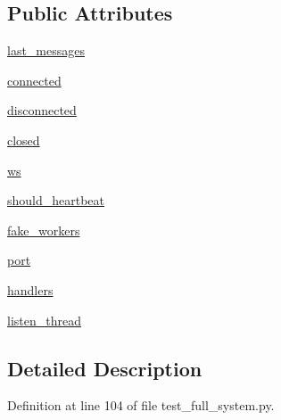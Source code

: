 \subsection*{Public Attributes}
\begin{DoxyCompactItemize}
\item 
\hyperlink{classparlai_1_1mturk_1_1core_1_1legacy__2018_1_1test_1_1test__full__system_1_1MockSocket_a24e7588b1330ebe50423cdfed7f11374}{last\+\_\+messages}
\item 
\hyperlink{classparlai_1_1mturk_1_1core_1_1legacy__2018_1_1test_1_1test__full__system_1_1MockSocket_a5e2362f162ac68cbc8ef7e6c8c356c23}{connected}
\item 
\hyperlink{classparlai_1_1mturk_1_1core_1_1legacy__2018_1_1test_1_1test__full__system_1_1MockSocket_a71c8013d07129adaf161734fcd0f7d63}{disconnected}
\item 
\hyperlink{classparlai_1_1mturk_1_1core_1_1legacy__2018_1_1test_1_1test__full__system_1_1MockSocket_a1f98802a97d72a1fcddcbbcdab42e6dc}{closed}
\item 
\hyperlink{classparlai_1_1mturk_1_1core_1_1legacy__2018_1_1test_1_1test__full__system_1_1MockSocket_a4880b2d86e4a803c00b8a3b1b9b83eeb}{ws}
\item 
\hyperlink{classparlai_1_1mturk_1_1core_1_1legacy__2018_1_1test_1_1test__full__system_1_1MockSocket_a390a8d5ddb5ab5e78079a83bf16c88d7}{should\+\_\+heartbeat}
\item 
\hyperlink{classparlai_1_1mturk_1_1core_1_1legacy__2018_1_1test_1_1test__full__system_1_1MockSocket_a9f9ba0003113026f7bd4e0cc4d6c3b24}{fake\+\_\+workers}
\item 
\hyperlink{classparlai_1_1mturk_1_1core_1_1legacy__2018_1_1test_1_1test__full__system_1_1MockSocket_a89cd4136510a4128b6307982f97103b1}{port}
\item 
\hyperlink{classparlai_1_1mturk_1_1core_1_1legacy__2018_1_1test_1_1test__full__system_1_1MockSocket_a531df078fba32032d5bbc2aa913b5ee9}{handlers}
\item 
\hyperlink{classparlai_1_1mturk_1_1core_1_1legacy__2018_1_1test_1_1test__full__system_1_1MockSocket_a98bef1be4e0a793cc81bd1f378e39eda}{listen\+\_\+thread}
\end{DoxyCompactItemize}


\subsection{Detailed Description}


Definition at line 104 of file test\+\_\+full\+\_\+system.\+py.



